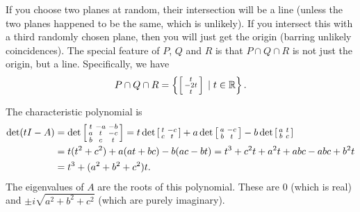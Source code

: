  If you choose two planes at random, their intersection will
 be a line (unless the two planes happened to be the same,
 which is unlikely).  If you intersect this with a third
 randomly chosen plane, then you will just get the origin
 (barring unlikely coincidences).  The special feature of
 $P$, $Q$ and $R$ is that $P\cap Q\cap R$ is not just the
 origin, but a line.  Specifically, we have
 \[ P\cap Q\cap R =
      \left\{\left[\begin{smallmatrix} t\\ -2t\\ t\end{smallmatrix}\right] \;|\; t\in{\mathbb{R}}\right\}.
 \]
\EndDeferredSolution

 The characteristic polynomial is
 \begin{align*}
  \det(tI-A)
   &= \det\left[\begin{smallmatrix} t & -a & -b \\
               a & t & -c \\
               b & c & t \end{smallmatrix}\right]
    =  t \det\left[\begin{smallmatrix} t & -c \\ c & t \end{smallmatrix}\right]
      +a \det\left[\begin{smallmatrix} a & -c \\ b & t \end{smallmatrix}\right]
      -b \det\left[\begin{smallmatrix} a & t \\ b & c \end{smallmatrix}\right] \\
   &= t(t^2+c^2) +a(at+bc) -b(ac-bt)
    = t^3 + c^2t + a^2t + abc - abc + b^2t \\
   &= t^3+(a^2+b^2+c^2)t.
 \end{align*}
 The eigenvalues of $A$ are the roots of this polynomial.
 These are $0$ (which is real) and $\pm i\sqrt{a^2+b^2+c^2}$
 (which are purely imaginary).
\EndDeferredSolution

